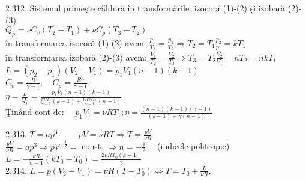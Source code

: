 2.312. Sistemul primeşte căldură în transformările: izocoră (1)-(2) și izobară (2)-(3)\\ $Q_{p}=\nu C_{v}\left(T_{2}-T_{1}\right)+\nu C_{p}\left(T_{3}-T_{2}\right)$\\ în transformarea izocoră (1)-(2) avem: $\frac{p_{1}}{T_{1}}=\frac{p_{2}}{T_{2}} \Rightarrow T_{2}=T_{1} \frac{p_{2}}{p_{1}}=k T_{1}$\\ în transformarea izobară (2)-(3) avem: $\frac{V_{1}}{T_{2}}=\frac{V_{2}}{T_{3}} \Rightarrow T_{3}=T_{2} \frac{V_{2}}{V_{1}}=n T_{2}=n k T_{1}$\\ $L=\left(p_{2}-p_{1}\right)\left(V_{2}-V_{1}\right)=p_{1} V_{1}(n-1)(k-1)$\\ $C_{v}=\frac{R}{\gamma-1} ; \quad C_{p}=\frac{R \gamma}{\gamma-1}$\\ $\eta=\frac{L}{Q_{p}}=\frac{p_{1} V_{1}(n-1)(k-1)}{\frac{\nu R T_{1}}{\gamma-1}(k-1)+\frac{\nu R \gamma k T_{1}}{\gamma-1}(n-1)}$\\ Ţinând cont de: $\quad p_{1} V_{1}=\nu R T_{1} ; \eta=\frac{(n-1)(k-1)(\gamma-1)}{(k-1)+\gamma(n-1)}$

2.313. $T=a p^{3} ; \quad \quad p V=\nu R T \Rightarrow T=\frac{p V}{\nu R}$ \\ $\frac{p V}{\nu R}=a p^{3} \Rightarrow p V^{-\frac{1}{2}}=$ const. $\Rightarrow n=-\frac{1}{2} \quad$ (indicele politropic) \\ $L=-\frac{\nu R}{n-1}\left(k T_{0}-T_{0}\right)=\frac{2 \nu R T_{0}(k-1)}{3}$\\

2.314. $L=p\left(V_{2}-V_{1}\right)=\nu R\left(T-T_{0}\right) \Leftrightarrow T=T_{0}+\frac{L}{\nu R}$.\\


